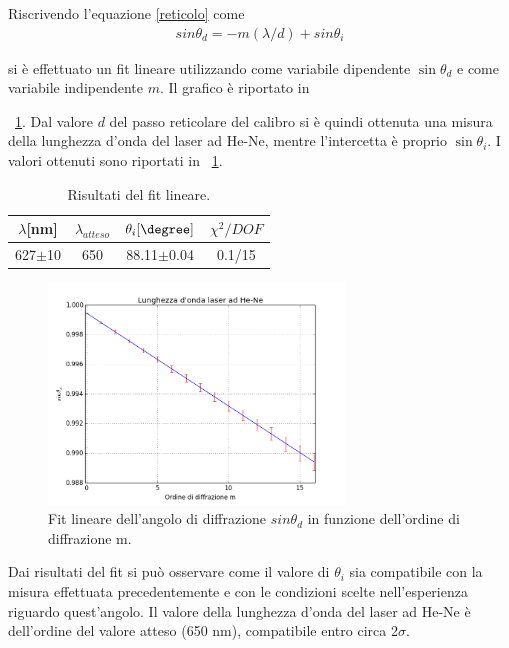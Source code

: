\documentclass[a4paper,10pt]{article}
\begin{document}
{{{Riscrivendo l'equazione \ref{reticolo} come
\begin{align*}
sin\theta_d = - m(\lambda/d) + sin\theta_i
\end{align*} 
  
si è effettuato un fit lineare utilizzando come variabile dipendente $\sin\theta_d$ e come variabile indipendente $m$. Il grafico è riportato in \figurename{~\ref{fig:fita}.
Dal valore $d$ del passo reticolare del calibro si è quindi ottenuta una misura della lunghezza d'onda del laser ad He-Ne, mentre l'intercetta è proprio $\sin\theta_i$. I valori ottenuti sono riportati in \tablename{~\ref{tab:fita}}.


\begin{table}[H]
	\centering
	\begin{tabular}{c|c|c|c}
$\lambda$[nm] &$\lambda_{atteso}$ &$\theta_i[\degree]$& $\chi^2/DOF$ \\
\hline
627$\pm$10 & 650 & 88.11$\pm$0.04 & 0.1/15\\
\hline
	\end{tabular}
\caption{Risultati del fit lineare.}
\label{tab:fita}
\end{table}


\begin{figure}[H]
	\centering
	\includegraphics[width=0.7\textwidth]{../grafici/fita.png}
	\caption{Fit lineare dell'angolo di diffrazione $sin\theta_d$ in funzione dell'ordine di diffrazione m.}
	\label{fig:fita}
\end{figure}


Dai risultati del fit si può osservare come il valore di $\theta_i$ sia compatibile con la misura effettuata precedentemente e con le condizioni scelte nell'esperienza riguardo quest'angolo.
Il valore della lunghezza d'onda del laser ad He-Ne è dell'ordine del valore atteso (650 nm), compatibile entro circa 2$\sigma$.

}}}}
\end{document}
